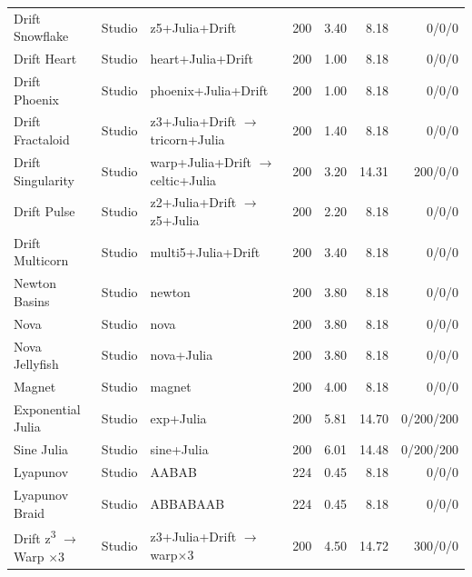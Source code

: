 \documentclass[11pt,a4paper]{article}
\numberwithin{equation}{section}
\newlength{\TW}
\begin{document}
\begin{longtable}{@{}L{0.2\TW}L{0.085\TW}L{0.232\TW}R{0.09\TW}R{0.139\TW}R{0.132\TW}R{0.122\TW}@{}}
Drift Snowflake & Studio & z5+Julia+Drift & 200 & 3.40 & 8.18 & \mbox{0/0/0} \\
Drift Heart & Studio & heart+Julia+Drift & 200 & 1.00 & 8.18 & \mbox{0/0/0} \\
Drift Phoenix & Studio & phoenix+Julia+Drift & 200 & 1.00 & 8.18 & \mbox{0/0/0} \\
Drift Fractaloid & Studio & z3+Julia+Drift \(\to\) tricorn+Julia & 200 & 1.40 & 8.18 & \mbox{0/0/0} \\
Drift Singularity & Studio & warp+Julia+Drift \(\to\) celtic+Julia & 200 & 3.20 & 14.31 & \mbox{200/0/0} \\
Drift Pulse & Studio & z2+Julia+Drift \(\to\) z5+Julia & 200 & 2.20 & 8.18 & \mbox{0/0/0} \\
Drift Multicorn & Studio & multi5+Julia+Drift & 200 & 3.40 & 8.18 & \mbox{0/0/0} \\
Newton Basins & Studio & newton & 200 & 3.80 & 8.18 & \mbox{0/0/0} \\
Nova & Studio & nova & 200 & 3.80 & 8.18 & \mbox{0/0/0} \\
Nova Jellyfish & Studio & nova+Julia & 200 & 3.80 & 8.18 & \mbox{0/0/0} \\
Magnet & Studio & magnet & 200 & 4.00 & 8.18 & \mbox{0/0/0} \\
Exponential Julia & Studio & exp+Julia & 200 & 5.81 & 14.70 & \mbox{0/200/200} \\
Sine Julia & Studio & sine+Julia & 200 & 6.01 & 14.48 & \mbox{0/200/200} \\
Lyapunov & Studio & AABAB & 224 & 0.45 & 8.18 & \mbox{0/0/0} \\
Lyapunov Braid & Studio & ABBABAAB & 224 & 0.45 & 8.18 & \mbox{0/0/0} \\
Drift z\textsuperscript{3} \(\to\) Warp \(\times\)3 & Studio & z3+Julia+Drift \(\to\) warp\(\times\)3 & 200 & 4.50 & 14.72 & \mbox{300/0/0} \\
\end{longtable}
\endgroup
\end{document}
